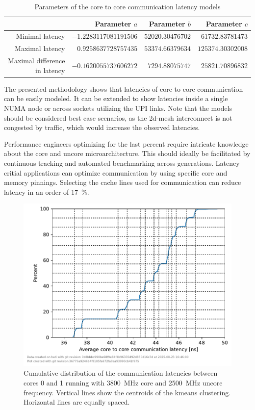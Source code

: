 \begin{table}[h]
	\centering
	\caption{\label{tab:latency_model_parameters}Parameters of the core to core communication latency models}
	\begin{tabular}{rrrr}
		 & Parameter $a$ & Parameter $b$ & Parameter $c$ \\
		\toprule
		\rowcolor[HTML]{EFEFEF}Minimal latency & $-1.2283117081191506$ & $52020.30476702$ & $61732.83781473$ \\
		Maximal latency & $0.9258637728757435$ & $53374.66379634$ & $125374.30302008$ \\
		\rowcolor[HTML]{EFEFEF}Maximal difference in latency & $-0.1620055737606272$ & $7294.88075747$ & $25821.70896832$ \\
		\bottomrule
	\end{tabular}
\end{table}

\clearpage

The presented methodology shows that latencies of core to core communication can be easily modeled.
It can be extended to show latencies inside a single NUMA node or across sockets utilizing the \ac{UPI} links.
Note that the models should be considered best case scenarios, as the 2d-mesh interconnect is not congested by traffic, which would increase the observed latencies.

Performance engineers optimizing for the last percent require intricate knowledge about the core and uncore microarchitecture.
This should ideally be facilitated by continuous tracking and automated benchmarking across generations.
Latency critial applications can optimize communication by using specific core and memory pinnings.
Selecting the cache lines used for communication can reduce latency in an order of \SI{17}{\percent}.

\begin{figure}[]
    \centering
    \includegraphics[width=0.8\columnwidth]{fig/core-to-core-latency/core0to1latency.pdf}
    \caption{\label{fig:cbo-latencies}Cumulative distribution of the communication latencies between cores 0 and 1 running with \SI{3800}{\MHz} core and \SI{2500}{\MHz} uncore frequency.
    Vertical lines show the centroids of the kmeans clustering.
    Horizontal lines are equally spaced.}
\end{figure}

